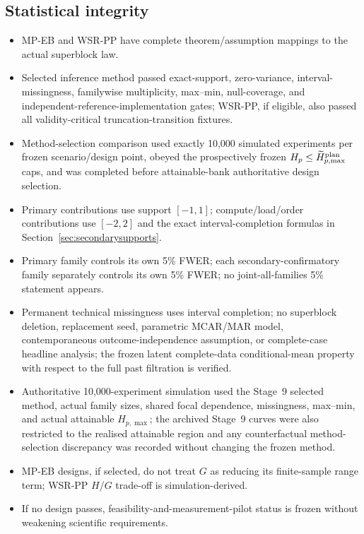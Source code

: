 \documentclass[11pt,a4paper]{article}
\begin{document}
\subsection{Statistical integrity}
\begin{itemize}
\item[$\square$] MP-EB and WSR-PP have complete theorem/assumption mappings to the actual superblock law.
\item[$\square$] Selected inference method passed exact-support, zero-variance, interval-missingness, familywise multiplicity, max--min, null-coverage, and independent-reference-implementation gates; WSR-PP, if eligible, also passed all validity-critical truncation-transition fixtures.
\item[$\square$] Method-selection comparison used exactly 10,000 simulated experiments per frozen scenario/design point, obeyed the prospectively frozen $H_p\le\widetilde H_{p,\max}^{\rm plan}$ caps, and was completed before attainable-bank authoritative design selection.
\item[$\square$] Primary contributions use support $[-1,1]$; compute/load/order contributions use $[-2,2]$ and the exact interval-completion formulas in Section~\ref{sec:secondarysupports}.
\item[$\square$] Primary family controls its own 5\% FWER; each secondary-confirmatory family separately controls its own 5\% FWER; no joint-all-families 5\% statement appears.
\item[$\square$] Permanent technical missingness uses interval completion; no superblock deletion, replacement seed, parametric MCAR/MAR model, contemporaneous outcome-independence assumption, or complete-case headline analysis; the frozen latent complete-data conditional-mean property with respect to the full past filtration is verified.
\item[$\square$] Authoritative 10,000-experiment simulation used the Stage~9 selected method, actual family sizes, shared focal dependence, missingness, max--min, and actual attainable $H_{p,\max}$; the archived Stage~9 curves were also restricted to the realised attainable region and any counterfactual method-selection discrepancy was recorded without changing the frozen method.
\item[$\square$] MP-EB designs, if selected, do not treat $G$ as reducing its finite-sample range term; WSR-PP $H$/$G$ trade-off is simulation-derived.
\item[$\square$] If no design passes, feasibility-and-measurement-pilot status is frozen without weakening scientific requirements.
\end{itemize}
\end{document}

